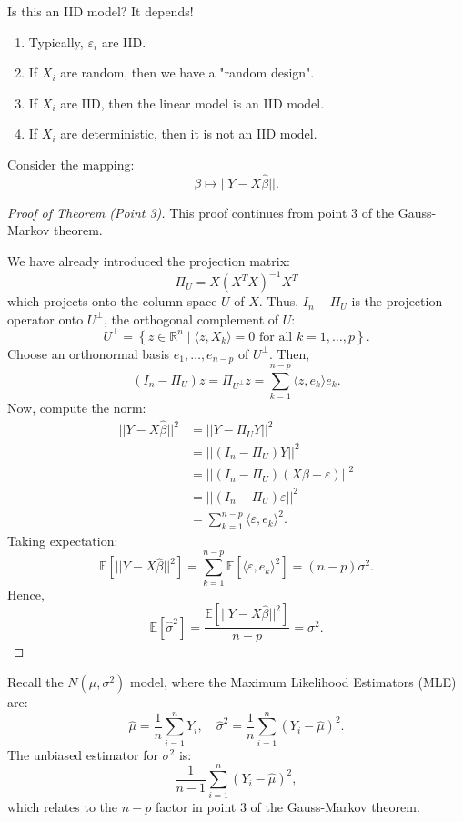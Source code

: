\documentclass[open=any, 11pt,paper=A4]{scrreprt}
\begin{document}
\begin{remark}
Is this an IID model? It depends!
\begin{enumerate}
    \item Typically, $\varepsilon_i$ are IID.
    \item If $X_i$ are random, then we have a "random design".
    \item If $X_i$ are IID, then the linear model is an IID model.
    \item If $X_i$ are deterministic, then it is not an IID model.
\end{enumerate}
\end{remark}

Consider the mapping:
\[
\beta \mapsto ||Y - X\hat{\beta}||.
\]

\begin{proof}[Proof of Theorem (Point 3)]
This proof continues from point 3 of the Gauss-Markov theorem.

We have already introduced the projection matrix:
\[
\Pi_U = X(X^T X)^{-1}X^T
\]
which projects onto the column space $U$ of $X$. Thus, $I_n - \Pi_U$ is the projection operator onto $U^\perp$, the orthogonal complement of $U$:
\[
U^\perp = \left\{ z \in \mathbb{R}^n \mid \langle z, X_k \rangle = 0 \text{ for all } k = 1, \hdots, p \right\}.
\]
Choose an orthonormal basis $e_1, \hdots, e_{n-p}$ of $U^\perp$. Then,
\[
(I_n - \Pi_U)z = \Pi_{U^\perp} z = \sum_{k=1}^{n-p} \langle z, e_k \rangle e_k.
\]
Now, compute the norm:
\begin{align*}
||Y - X\hat{\beta}||^2 &= ||Y - \Pi_U Y||^2 \\
&= ||(I_n - \Pi_U) Y||^2 \\
&= ||(I_n - \Pi_U)(X\beta + \varepsilon)||^2 \\
&= ||(I_n - \Pi_U)\varepsilon||^2 \\
&= \sum_{k=1}^{n-p} \langle \varepsilon, e_k \rangle^2.
\end{align*}
Taking expectation:
\[
\mathbb{E}\left[ ||Y - X\hat{\beta}||^2 \right] = \sum_{k=1}^{n-p} \mathbb{E}\left[ \langle \varepsilon, e_k \rangle^2 \right] = (n - p) \sigma^2.
\]
Hence, 
\[
\mathbb{E}\left[ \hat{\sigma}^2 \right] = \frac{\mathbb{E}\left[ ||Y - X\hat{\beta}||^2 \right]}{n - p} = \sigma^2.
\]
\end{proof}

\begin{remark}
Recall the $N(\mu, \sigma^2)$ model, where the Maximum Likelihood Estimators (MLE) are:
\[
\hat{\mu} = \frac{1}{n} \sum_{i=1}^{n} Y_i, \quad \hat{\sigma}^2 = \frac{1}{n} \sum_{i=1}^{n} (Y_i - \hat{\mu})^2.
\]
The unbiased estimator for $\sigma^2$ is:
\[
\frac{1}{n - 1} \sum_{i=1}^{n} (Y_i - \hat{\mu})^2,
\]
which relates to the $n - p$ factor in point 3 of the Gauss-Markov theorem.
\end{remark}
\end{document}
